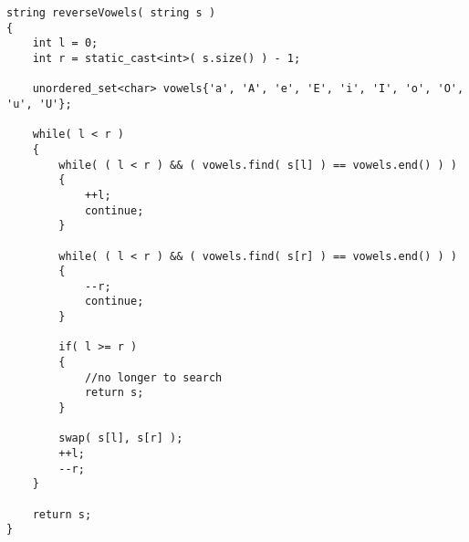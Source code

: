 \setcounter{lstlisting}{0}
\begin{lstlisting}[style=customc, caption={Two Pointers}]
string reverseVowels( string s )
{
    int l = 0;
    int r = static_cast<int>( s.size() ) - 1;

    unordered_set<char> vowels{'a', 'A', 'e', 'E', 'i', 'I', 'o', 'O', 'u', 'U'};

    while( l < r )
    {
        while( ( l < r ) && ( vowels.find( s[l] ) == vowels.end() ) )
        {
            ++l;
            continue;
        }

        while( ( l < r ) && ( vowels.find( s[r] ) == vowels.end() ) )
        {
            --r;
            continue;
        }

        if( l >= r )
        {
            //no longer to search
            return s;
        }

        swap( s[l], s[r] );
        ++l;
        --r;
    }

    return s;
}

\end{lstlisting}